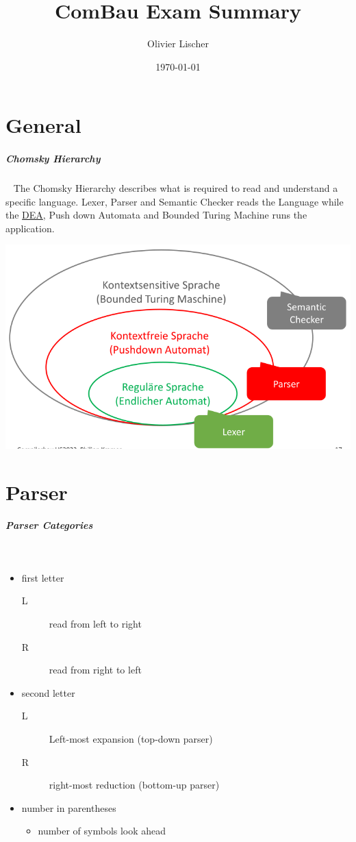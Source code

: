 \documentclass[12pt,twoside,landscape]{extarticle}
\author{Olivier Lischer}
\date{\today}
\title{ComBau Exam Summary}
\begin{document}
\begin{multicols}{4}

\section{General}
\label{sec:org7b5a2bf}
\subparagraph{Chomsky Hierarchy} \
\label{sec:org0b228d1}
The Chomsky Hierarchy describes what is required to read and understand a specific language.
Lexer, Parser and Semantic Checker reads the Language while the \href{../../../roam/20211109182310-deterministic_finite_automaton.org}{DEA}, Push down Automata and Bounded Turing Machine runs the application.

{
\begin{center}
\includegraphics[width=.9\linewidth]{img/chomsky_hierarchie.png}
\end{center}
\label{fig:chomsky-hierarchy}
}

\section{Parser}
\label{sec:org1cd8a81}
\subparagraph{Parser Categories} \
\label{sec:org9a60e97}
\begin{itemize}
\item first letter
\begin{description}
\item[{L}] read from left to right
\item[{R}] read from right to left
\end{description}
\item second letter
\begin{description}
\item[{L}] Left-most expansion (top-down parser)
\item[{R}] right-most reduction (bottom-up parser)
\end{description}
\item number in parentheses
\begin{itemize}
\item number of symbols look ahead
\end{itemize}
\end{itemize}


\end{multicols}
\end{document}
